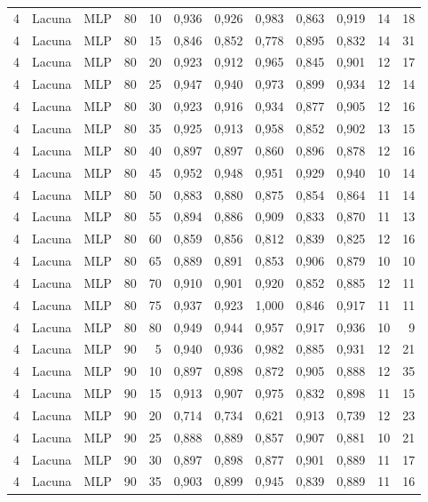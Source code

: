 \begin{longtable}{@{}rllrrrrrrrrr@{}}
4 & Lacuna & MLP & 80 & 10 & 0,936 & 0,926 & 0,983 & 0,863 & 0,919 & 14 & 18 \\
4 & Lacuna & MLP & 80 & 15 & 0,846 & 0,852 & 0,778 & 0,895 & 0,832 & 14 & 31 \\
4 & Lacuna & MLP & 80 & 20 & 0,923 & 0,912 & 0,965 & 0,845 & 0,901 & 12 & 17 \\
4 & Lacuna & MLP & 80 & 25 & 0,947 & 0,940 & 0,973 & 0,899 & 0,934 & 12 & 14 \\
4 & Lacuna & MLP & 80 & 30 & 0,923 & 0,916 & 0,934 & 0,877 & 0,905 & 12 & 16 \\
4 & Lacuna & MLP & 80 & 35 & 0,925 & 0,913 & 0,958 & 0,852 & 0,902 & 13 & 15 \\
4 & Lacuna & MLP & 80 & 40 & 0,897 & 0,897 & 0,860 & 0,896 & 0,878 & 12 & 16 \\
4 & Lacuna & MLP & 80 & 45 & 0,952 & 0,948 & 0,951 & 0,929 & 0,940 & 10 & 14 \\
4 & Lacuna & MLP & 80 & 50 & 0,883 & 0,880 & 0,875 & 0,854 & 0,864 & 11 & 14 \\
4 & Lacuna & MLP & 80 & 55 & 0,894 & 0,886 & 0,909 & 0,833 & 0,870 & 11 & 13 \\
4 & Lacuna & MLP & 80 & 60 & 0,859 & 0,856 & 0,812 & 0,839 & 0,825 & 12 & 16 \\
4 & Lacuna & MLP & 80 & 65 & 0,889 & 0,891 & 0,853 & 0,906 & 0,879 & 10 & 10 \\
4 & Lacuna & MLP & 80 & 70 & 0,910 & 0,901 & 0,920 & 0,852 & 0,885 & 12 & 11 \\
4 & Lacuna & MLP & 80 & 75 & 0,937 & 0,923 & 1,000 & 0,846 & 0,917 & 11 & 11 \\
4 & Lacuna & MLP & 80 & 80 & 0,949 & 0,944 & 0,957 & 0,917 & 0,936 & 10 & 9 \\
4 & Lacuna & MLP & 90 & 5 & 0,940 & 0,936 & 0,982 & 0,885 & 0,931 & 12 & 21 \\
4 & Lacuna & MLP & 90 & 10 & 0,897 & 0,898 & 0,872 & 0,905 & 0,888 & 12 & 35 \\
4 & Lacuna & MLP & 90 & 15 & 0,913 & 0,907 & 0,975 & 0,832 & 0,898 & 11 & 15 \\
4 & Lacuna & MLP & 90 & 20 & 0,714 & 0,734 & 0,621 & 0,913 & 0,739 & 12 & 23 \\
4 & Lacuna & MLP & 90 & 25 & 0,888 & 0,889 & 0,857 & 0,907 & 0,881 & 10 & 21 \\
4 & Lacuna & MLP & 90 & 30 & 0,897 & 0,898 & 0,877 & 0,901 & 0,889 & 11 & 17 \\
4 & Lacuna & MLP & 90 & 35 & 0,903 & 0,899 & 0,945 & 0,839 & 0,889 & 11 & 16 \\

\end{longtable}
